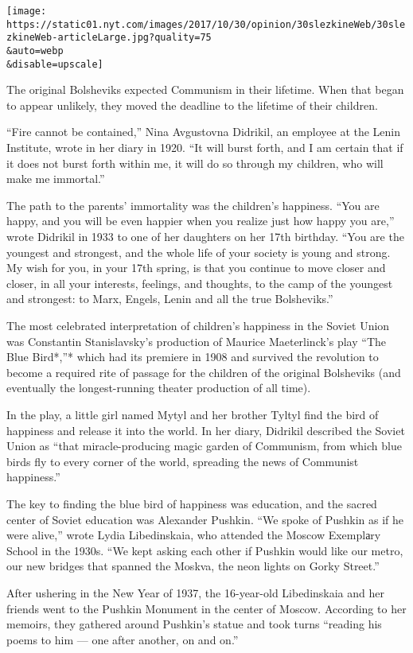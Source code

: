 \texttt{[image: https://static01.nyt.com/images/2017/10/30/opinion/30slezkineWeb/30slezkineWeb-articleLarge.jpg?quality=75\\\&auto=webp\\\&disable=upscale]}

The original Bolsheviks expected Communism in their lifetime. When that
began to appear unlikely, they moved the deadline to the lifetime of
their children.

``Fire cannot be contained,'' Nina Avgustovna Didrikil, an employee at
the Lenin Institute, wrote in her diary in 1920. ``It will burst forth,
and I am certain that if it does not burst forth within me, it will do
so through my children, who will make me immortal.''

The path to the parents' immortality was the children's happiness. ``You
are happy, and you will be even happier when you realize just how happy
you are,'' wrote Didrikil in 1933 to one of her daughters on her 17th
birthday. ``You are the youngest and strongest, and the whole life of
your society is young and strong. My wish for you, in your 17th spring,
is that you continue to move closer and closer, in all your interests,
feelings, and thoughts, to the camp of the youngest and strongest: to
Marx, Engels, Lenin and all the true Bolsheviks.''

The most celebrated interpretation of children's happiness in the Soviet
Union was Constantin Stanislavsky's production of Maurice Maeterlinck's
play ``The Blue Bird*,''* which had its premiere in 1908 and survived
the revolution to become a required rite of passage for the children of
the original Bolsheviks (and eventually the longest-running theater
production of all time).

In the play, a little girl named Mytyl and her brother Tyltyl find the
bird of happiness and release it into the world. In her diary, Didrikil
described the Soviet Union as ``that miracle-producing magic garden of
Communism, from which blue birds fly to every corner of the world,
spreading the news of Communist happiness.''

The key to finding the blue bird of happiness was education, and the
sacred center of Soviet education was Alexander Pushkin. ``We spoke of
Pushkin as if he were alive,'' wrote Lydia Libedinskaia, who attended
the Moscow Exemplаry School in the 1930s. ``We kept asking each other if
Pushkin would like our metro, our new bridges that spanned the Moskva,
the neon lights on Gorky Street.''

After ushering in the New Year of 1937, the 16-year-old Libedinskaia and
her friends went to the Pushkin Monument in the center of Moscow.
According to her memoirs, they gathered around Pushkin's statue and took
turns ``reading his poems to him --- one after another, on and on.''

